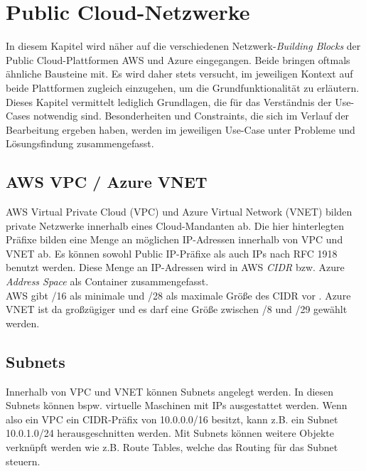 \section{Public Cloud-Netzwerke}\label{public-cloud-networking}
In diesem Kapitel wird näher auf die verschiedenen Netzwerk-\textit{Building Blocks} der Public Cloud-Plattformen AWS und Azure eingegangen. Beide bringen oftmals ähnliche Bausteine mit. Es wird daher stets versucht, im jeweiligen Kontext auf beide Plattformen zugleich einzugehen, um die Grundfunktionalität zu erläutern.
Dieses Kapitel vermittelt lediglich Grundlagen, die für das Verständnis der Use-Cases notwendig sind. Besonderheiten und Constraints, die sich im Verlauf der Bearbeitung ergeben haben, werden im jeweiligen Use-Case unter \glqq Probleme und Lösungsfindung\grqq{} zusammengefasst.

\subsection{AWS VPC / Azure VNET}
AWS Virtual Private Cloud (VPC) und Azure Virtual Network (VNET) bilden private Netzwerke innerhalb eines Cloud-Mandanten ab. Die hier hinterlegten Präfixe bilden eine Menge an möglichen IP-Adressen innerhalb von VPC und VNET ab. Es können sowohl Public IP-Präfixe als auch IPs nach RFC 1918 benutzt werden. Diese Menge an IP-Adressen wird in AWS \textit{CIDR} bzw. Azure \textit{Address Space} als Container zusammengefasst.\\
AWS gibt /16 als minimale und /28 als maximale Größe des CIDR vor \cite[S.100]{awsug2020}. Azure VNET ist da großzügiger und es darf eine Größe zwischen /8 und /29 gewählt werden\cite[S.10]{Toroman2019}. 
\subsection{Subnets}
Innerhalb von VPC und VNET können Subnets angelegt werden. In diesen Subnets können bspw. virtuelle Maschinen mit IPs ausgestattet werden. Wenn also ein VPC ein CIDR-Präfix von 10.0.0.0/16 besitzt, kann z.B. ein Subnet 10.0.1.0/24 \glqq herausgeschnitten\grqq{} werden. Mit Subnets können weitere Objekte verknüpft werden wie z.B. Route Tables, welche das Routing für das Subnet steuern.

